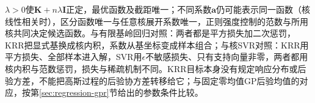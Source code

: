$\lambda>0$使$\bm{K}+n\lambda\bm{I}$正定，最优函数及截距唯一；不同系数$\bm{a}$仍可能表示同一函数（核线性相关时），区分函数唯一与任意核展开系数唯一，正则强度控制的范数与所用核共同决定候选函数。与有限基岭回归对照：两者都是平方损失加二次惩罚，KRR把显式基换成核内积，系数从基坐标变成样本组合；与核SVR对照：KRR用平方损失、全部样本进入解，SVR用$\epsilon$不敏感损失、只有支持向量非零，两者都用核内积与范数惩罚，损失与稀疏机制不同。KRR目标本身没有规定响应分布或后验方差，不能把高斯过程的后验协方差转移给它；与固定零均值GP后验均值的对应，按第\ref{sec:regression-gpr}节给出的参数条件比较。